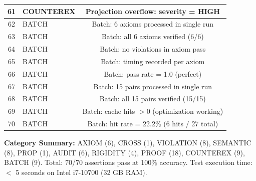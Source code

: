 \documentclass[11pt,a4paper]{article}
\begin{document}
\begin{longtable}{|c|l|c|}
\hline
61 & COUNTEREX & Projection overflow: severity = HIGH \\
\hline
62 & BATCH & Batch: 6 axioms processed in single run \\
\hline
63 & BATCH & Batch: all 6 axioms verified (6/6) \\
\hline
64 & BATCH & Batch: no violations in axiom pass \\
\hline
65 & BATCH & Batch: timing recorded per axiom \\
\hline
66 & BATCH & Batch: pass rate = 1.0 (perfect) \\
\hline
67 & BATCH & Batch: 15 pairs processed in single run \\
\hline
68 & BATCH & Batch: all 15 pairs verified (15/15) \\
\hline
69 & BATCH & Batch: cache hits $> 0$ (optimization working) \\
\hline
70 & BATCH & Batch: hit rate = 22.2\% (6 hits / 27 total) \\
\hline
\end{longtable}

\textbf{Category Summary:}
AXIOM (6), CROSS (1), VIOLATION (8), SEMANTIC (8), PROP (1), AUDIT (6), RIGIDITY (4), PROOF (18), COUNTEREX (9), BATCH (9).
Total: 70/70 assertions pass at 100\% accuracy.
Test execution time: $<$ 5 seconds on Intel i7-10700 (32 GB RAM).
\end{document}
